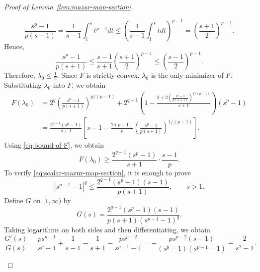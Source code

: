 \documentclass[10pt,a4paper]{amsart}
\begin{document}
\begin{proof}[Proof of Lemma~\ref{lem:mazur-map-section}]
\begin{enumerate}[wide =0pt, labelwidth= 1.1cm]
\begin{equation}
    \label{eq:Jen-with-s}
        \frac{s^p-1}{p(s-1)} =\frac{1}{s-1}\int_1^s t^{p-1} dt \leq \left(\frac{1}{s-1} \int_1^s t d t \right)^{p-1} = \left(\frac{s+1}{2}\right)^{p-1}.
    \end{equation}
    Hence,
    \begin{equation} 
    \frac{s^p-1}{p(s+1)}
\leq
    \frac{s-1}{s+1}
    \left(\frac{s+1}{2}\right)^{p-1}
    \leq
    \left(\frac{s-1}{2}\right)^{p-1}. \label{eq:bound-of-F}
    \end{equation}
    Therefore, $\lambda_0 \leq \frac{1}{2}$. Since $F$ is strictly convex, $\lambda_0$ is the only minimizer of $F$. 
    Substituting $\lambda_0$ into $F$, we obtain 
    \begin{align}
        F\left(\lambda_0\right)&=2^q  \left(\frac{s^p-1}{p(s+1)}\right)^{p /(p-1)} 
         +2^{q-1}\left(1-\frac{2+2\left(\frac{s^p-1}{p(s+1)}\right)^{1 /(p-1)}}{s+1}\right)\left(s^p-1\right)
         \\ & 
         =\frac{2^{q-1}\left(s^p-1\right)}{s+1}\left[s-1-\frac{2(p-1)}{p}\left(\frac{s^p-1}{p(s+1)}\right)^{1 /(p-1)}\right] .
    \end{align}
    Using \eqref{eq:bound-of-F}, we obtain
    \[
        F(\lambda_0) \geq \frac{2^{q-1}\left(s^p-1\right)}{s+1} \cdot \frac{s-1}{p}.
    \]
    To verify \eqref{eq:scalar-mazur-map-section}, it is enough to prove
    \begin{equation} \label{eq:to-prove-final-s}
        |s^{p-1} -1|^q \leq \frac{2^{q-1}\left(s^p-1\right)(s-1)}{p(s+1)}, \qquad s> 1.
    \end{equation}
    Define $G$ on $[1,\infty)$ by
    \[
        G(s)=
        \frac{
            2^{q-1}(s^p-1)(s-1)
        }{
            p(s+1)(s^{p-1}-1)^q
        }.
    \]
    Taking logarithms on both sides and then differentiating, we obtain
    \[
        \frac{G'(s)}{G(s)}
   =
    \frac{p s^{p-1}}{s^p-1}
    +
    \frac{1}{s-1}
    -
    \frac{1}{s+1}
    -
    \frac{p s^{p-2}}{s^{p-1}-1}
=
    -\frac{
        p s^{p-2}(s-1)
    }{
        (s^p-1)(s^{p-1}-1)
    }
    +
    \frac{2}{s^2-1}.
\]
\end{enumerate}
\end{proof}
\end{document}

